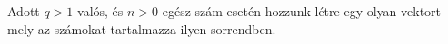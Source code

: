 Adott $q>1$ valós, és $n>0$ egész szám esetén hozzunk létre 
egy olyan vektort mely az
számokat tartalmazza ilyen sorrendben.



